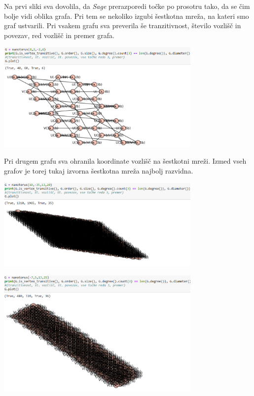 \documentclass[a4paper, 11 pt]{article}
\begin{document}
Na prvi sliki sva dovolila, da \textit{Sage} prerazporedi točke po prosotru tako, da se čim bolje vidi oblika grafa. Pri tem se nekoliko izgubi šestkotna mreža, na kateri smo graf ustvarili. Pri vsakem grafu sva preverila še tranzitivnost, število vozlišč in povezav, red vozlišč in premer grafa.
\vspace{1cm}

\begin{center}
\includegraphics[width=10cm]{nano3}
\end{center}
\vspace{1cm}

Pri drugem grafu sva ohranila koordinate vozlišč na šestkotni mreži. Izmed vseh grafov je torej tukaj izvorna šestkotna mreža najbolj razvidna.
\vspace{1cm}

\begin{center}
\includegraphics[width=10cm]{nano1}
\end{center}
\vspace{1cm}
\begin{center}
\includegraphics[width=10cm]{nano4}
\end{center}
\vspace{1cm}
\end{document}
